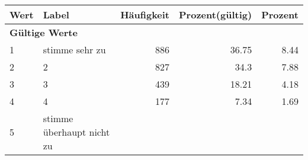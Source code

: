      \begin{longtable}{lXrrr}
     \toprule
     \textbf{Wert} & \textbf{Label} & \textbf{Häufigkeit} & \textbf{Prozent(gültig)} & \textbf{Prozent} \\
     \endhead
     \midrule
     \multicolumn{5}{l}{\textbf{Gültige Werte}}\\

     1 &
     \multicolumn{1}{X}{ stimme sehr zu   } &


       \num{886} &
       \num[round-mode=places,round-precision=2]{36.75} &
         \num[round-mode=places,round-precision=2]{8.44} \\

     2 &
     \multicolumn{1}{X}{ 2   } &


       \num{827} &
       \num[round-mode=places,round-precision=2]{34.3} &
         \num[round-mode=places,round-precision=2]{7.88} \\

     3 &
     \multicolumn{1}{X}{ 3   } &


       \num{439} &
       \num[round-mode=places,round-precision=2]{18.21} &
         \num[round-mode=places,round-precision=2]{4.18} \\

     4 &
     \multicolumn{1}{X}{ 4   } &


       \num{177} &
       \num[round-mode=places,round-precision=2]{7.34} &
         \num[round-mode=places,round-precision=2]{1.69} \\

     5 &
     \multicolumn{1}{X}{ stimme überhaupt nicht zu   } &



\end{longtable}
